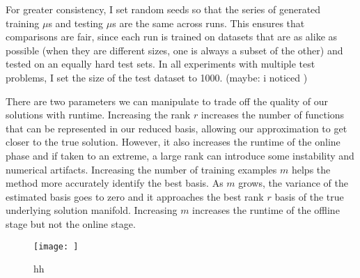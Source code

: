 \documentclass[11pt]{article}
\begin{document}
For greater consistency, I set random seeds so that the series of generated training $\mu$s and testing $\mu$s
are the same across runs. This ensures that comparisons are fair, since each run is trained on 
datasets that are as alike as possible (when they are different sizes, one is always a subset of the other)
and tested on an equally hard test sets.
In all experiments with multiple test problems, I set the size of the test dataset to 1000.
(maybe: i noticed )

There are two parameters we can manipulate to trade off the quality of our solutions
with runtime. Increasing the rank $r$ increases
the number of functions that can be represented in our reduced basis,
allowing our approximation to get closer to the true solution.
However, it also increases the runtime of the online phase and if taken to an
extreme, a large rank can introduce some instability and numerical artifacts.
Increasing the number of training examples $m$ helps the method more accurately
identify the best basis. As $m$ grows, the variance of the estimated basis goes to zero
and it approaches the best rank $r$ basis of the true underlying solution manifold.
Increasing $m$ increases the runtime of the offline stage but not the online stage.

\begin{figure}
    \centering
    \texttt{[image: ]}
    \caption{hh}
\end{figure}
\printbibliography
\end{document}
